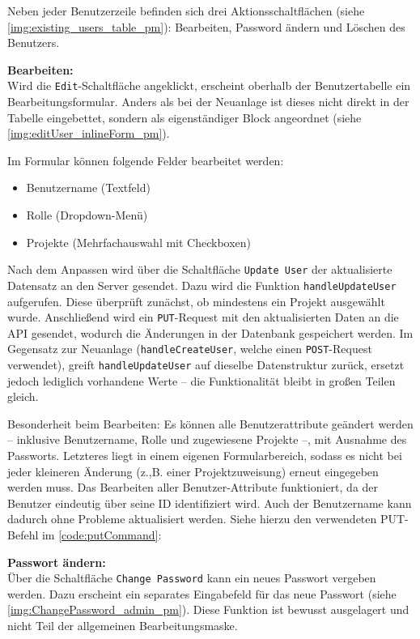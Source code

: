 Neben jeder Benutzerzeile befinden sich drei Aktionsschaltflächen (siehe \autoref{img:existing_users_table_pm}): Bearbeiten, Password ändern und Löschen des Benutzers.

\textbf{Bearbeiten:}\\
Wird die \texttt{Edit}-Schaltfläche angeklickt, erscheint oberhalb der Benutzertabelle ein Bearbeitungsformular. Anders als bei der Neuanlage ist dieses nicht direkt in der Tabelle eingebettet, sondern als eigenständiger Block angeordnet (siehe \autoref{img:editUser_inlineForm_pm}).


Im Formular können folgende Felder bearbeitet werden:

\begin{itemize}
  \item Benutzername (Textfeld)
  \item Rolle (Dropdown-Menü)
  \item Projekte (Mehrfachauswahl mit Checkboxen)
\end{itemize}

Nach dem Anpassen wird über die Schaltfläche \texttt{Update User} der aktualisierte Datensatz an den Server gesendet. Dazu wird die Funktion \texttt{handleUpdateUser} aufgerufen. Diese überprüft zunächst, ob mindestens ein Projekt ausgewählt wurde. Anschließend wird ein \texttt{PUT}-Request mit den aktualisierten Daten an die API gesendet, wodurch die Änderungen in der Datenbank gespeichert werden.
Im Gegensatz zur Neuanlage (\texttt{handleCreateUser}, welche einen \texttt{POST}-Request verwendet), greift \texttt{handleUpdateUser} auf dieselbe Datenstruktur zurück, ersetzt jedoch lediglich vorhandene Werte – die Funktionalität bleibt in großen Teilen gleich.

Besonderheit beim Bearbeiten: Es können alle Benutzerattribute geändert werden – inklusive Benutzername, Rolle und zugewiesene Projekte –, mit Ausnahme des Passworts. Letzteres liegt in einem eigenen Formularbereich, sodass es nicht bei jeder kleineren Änderung (z.,B. einer Projektzuweisung) erneut eingegeben werden muss. Das Bearbeiten aller Benutzer-Attribute funktioniert, da der Benutzer eindeutig über seine ID identifiziert wird. Auch der Benutzername kann dadurch ohne Probleme aktualisiert werden. Siehe hierzu den verwendeten PUT-Befehl im \autoref{code:putCommand}:

\textbf{Passwort ändern:}\\
Über die Schaltfläche \texttt{Change Password} kann ein neues Passwort vergeben werden. Dazu erscheint ein separates Eingabefeld für das neue Passwort (siehe \autoref{img:ChangePassword_admin_pm}). Diese Funktion ist bewusst ausgelagert und nicht Teil der allgemeinen Bearbeitungsmaske.


